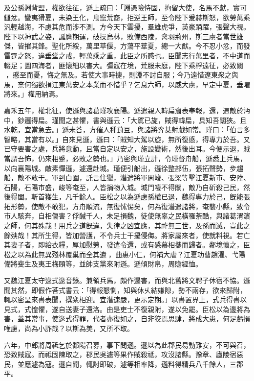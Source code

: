 \begin{pinyinscope}
及公孫淵背盟，權欲往征，遜上疏曰：「淵憑險恃固，拘留大使，名馬不獻，實可讎忿。蠻夷猾夏，未染王化，鳥竄荒裔，拒逆王師，至令陛下爰赫斯怒，欲勞萬乘汎輕越海，不慮其危而涉不測。方今天下雲擾，羣雄虎爭，英豪踊躍，張聲大視。陛下以神武之姿，誕膺期運，破操烏林，敗備西陵，禽羽荊州，斯三虜者當世雄傑，皆摧其鋒。聖化所綏，萬里草偃，方蕩平華夏，總一大猷。今不忍小忿，而發雷霆之怒，違垂堂之戒，輕萬乘之重，此臣之所惑也。臣聞志行萬里者，不中道而輟足；圖四海者，匪懷細以害大。彊寇在境，荒服未庭，陛下乘桴遠征，必致闚𨵦，慼至而憂，悔之無及。若使大事時捷，則淵不討自服；今乃遠惜遼東衆之與馬，柰何獨欲捐江東萬安之本業而不惜乎？乞息六師，以威大虜，早定中夏，垂曜將來。」權用納焉。

嘉禾五年，權北征，使遜與諸葛瑾攻襄陽。遜遣親人韓扁齎表奉報，還，遇敵於沔中，鈔邏得扁。瑾聞之甚懼，書與遜云：「大駕已旋，賊得韓扁，具知吾闊狹。且水乾，宜當急去。」遜未荅，方催人種葑豆，與諸將弈棊射戲如常。瑾曰：「伯言多智略，其當有以。」自來見遜，遜曰：「賊知大駕以旋，無所復慼，得專力於吾。又已守要害之處，兵將意動，且當自定以安之，施設變術，然後出耳。今便示退，賊當謂吾怖，仍來相蹙，必敗之勢也。」乃密與瑾立計，令瑾督舟船，遜悉上兵馬，以向襄陽城。敵素憚遜，遽還赴城。瑾便引船出，遜徐整部伍，張拓聲勢，步趨船，敵不敢干。軍到白圍，託言住獵，潛遣將軍周峻、張梁等擊江夏新市、安陸、石陽，石陽市盛，峻等奄至，人皆捐物入城。城門噎不得關，敵乃自斫殺己民，然後得闔。斬首獲生，凡千餘人。臣松之以為遜慮孫權已退，魏得專力於己，旣能張拓形勢，使敵不敢犯，方舟順流，無復怵惕矣，何為復潛遣諸將，奄襲小縣，致令市人駭奔，自相傷害？俘馘千人，未足損魏，徒使無辜之民橫罹荼酷，與諸葛渭濵之師，何其殊哉！用兵之道旣違，失律之凶宜應，其祚無三世，及孫而滅，豈此之餘殃哉！其所生得，皆加營護，不令兵士干擾侵侮。將家屬來者，使就料視。若亡其妻子者，即給衣糧，厚加慰勞，發遣令還，或有感慕相攜而歸者。鄰境懷之，臣松之以為此無異殘林覆巢而全其遺𪅏，曲惠小仁，何補大虐？江夏功曹趙濯、弋陽備將斐生及夷王梅頤等，並帥支黨來附遜。遜傾財帛，周贍經恤。

又魏江夏太守逯式逯音錄。兼領兵馬，頗作邊害，而與北舊將文聘子休宿不協。遜聞其然，即假作荅式書云：「得報懇惻，知與休乆結嫌隙，勢不兩存，欲來歸附，輒以密呈來書表聞，撰衆相迎。宜潛速嚴，更示定期。」以書置界上，式兵得書以見式，式惶懼，遂自送妻子還洛。由是吏士不復親附，遂以免罷。臣松以為邊將為害，蓋其常事，使逯式得罪，代者亦復如之，自非狡焉思肆，將成大患，何足虧損唯慮，尚為小詐哉？以斯為美，又所不取。

六年，中郎將周祗乞於鄱陽召募，事下問遜。遜以為此郡民易動難安，不可與召，恐致賊寇。而祗固陳取之，郡民吳遽等果作賊殺祗，攻沒諸縣。豫章、廬陵宿惡民，並應遽為寇。遜自聞，輒討即破，遽等相率降，遜料得精兵八千餘人，三郡平。


\end{pinyinscope}
